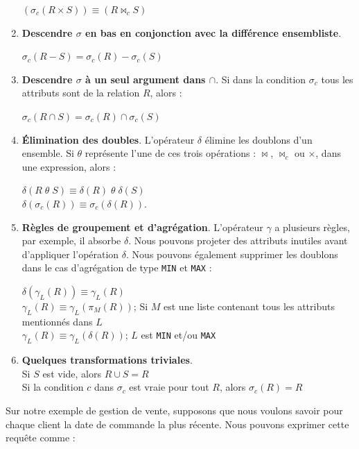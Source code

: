 \begin{enumerate}
 $(\sigma_c (R \times S)) \equiv (R \bowtie_c S)$
 
 \item \textbf{Descendre $\sigma$ en bas en conjonction avec la différence ensembliste}.
 
 $\sigma_c (R - S) = \sigma_c (R) - \sigma_c ( S)$
 
 \item \textbf{Descendre $\sigma$ à un seul argument dans $\cap$}. Si dans la condition $\sigma_c$ tous les attributs sont de la relation $R$, alors :
 
 $\sigma_c (R \cap S) = \sigma_c (R) \cap \sigma_c (S)$
 
 \item \textbf{Élimination des doubles}. L'opérateur $\delta$ élimine les doublons d'un ensemble. Si $\theta$ représente l'une de ces trois opérations : $\bowtie$, $\bowtie_c$ ou $\times$, dans une expression, alors :
 
 $\delta(R \; \theta \; S ) \equiv \delta(R) \; \theta \; \delta(S)$\\
 $\delta(\sigma_c (R)) \equiv \sigma_c (\delta(R)).$
 
 \item \textbf{Règles de groupement et d’agrégation}. L'opérateur $\gamma$ a plusieurs règles, par exemple, il absorbe $\delta$. Nous pouvons projeter des attributs inutiles avant d'appliquer l'opération $\delta$. Nous pouvons également supprimer les doublons dans le cas d'agrégation de type \texttt{MIN} et \texttt{MAX} :
 
 $\delta (\gamma_L(R)) \equiv \gamma_L(R)$\\
 $\gamma_L (R) \equiv \gamma_L (\pi_M(R))$; Si $M$ est une liste contenant tous les attributs mentionnés dans $L$\\
 $\gamma_L (R) \equiv \gamma_L (\delta(R))$; $L$ est \texttt{MIN} et/ou \texttt{MAX}
 
 \item \textbf{Quelques transformations triviales}.\\
 Si $S$ est vide, alors $R \cup S = R$\\
 Si la condition $c$ dans $\sigma_c$ est vraie pour tout $R$, alors $\sigma_c (R) = R$
\end{enumerate}

\begin{example}\label{ex:transformation-query}
 Sur notre exemple de gestion de vente, supposons que nous voulons savoir pour chaque client la date de commande la plus récente. Nous pouvons exprimer cette requête comme :
\end{example}


